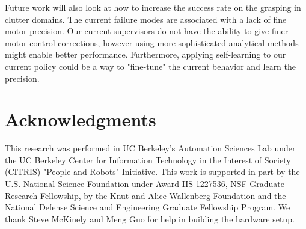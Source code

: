 \documentclass[10pt, conference]{ieeeconf}      %
\begin{document}
Future work will also look at how to increase the success rate on the grasping in clutter domains. The current failure modes are associated with a lack of fine motor precision. Our current supervisors do not  have the ability to give finer motor control corrections, however using more sophisticated analytical methods might enable better performance. Furthermore, applying self-learning  to our current policy could be a way to "fine-tune" the current behavior and learn the precision. 




 \section{Acknowledgments} 
This research was performed in UC Berkeley's Automation Sciences Lab under the UC Berkeley Center for Information Technology in the Interest of Society (CITRIS) "People and Robots" Initiative. This work is supported in part by the U.S. National Science Foundation under Award IIS-1227536, NSF-Graduate Research Fellowship, by the Knut and Alice Wallenberg Foundation and the National Defense Science and Engineering Graduate Fellowship Program. We thank Steve McKinely and Meng Guo for help in building the hardware setup.  

  


\end{document}
